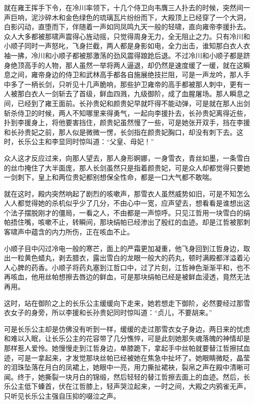 就在雍王挥手下令，在冷川率领下，十几个侍卫向韦膺三人扑去的时候，突然间一声巨响，泥沙碎木和金色绿色的琉璃瓦片纷纷而下，大殿顶上已经穿了一个大洞，白影闪动，直堕而下，伴随着一声如同凤鸣九天一般的轻啸，直向雍帝李援扑去。众人大多都被那啸声震得心旌动摇，只觉得周身无力，全无阻止之力。只有冷川和小顺子同时一声怒叱，飞身拦截，两人都是身影如电，全力出击，谁知那白衣人衣袖一拂，冷川和小顺子都被那激荡的劲风震得踉跄后退。不过冷川和小顺子都是跻身绝顶高手的人物，那人虽然一举将两人逼退，却仍然是速度缓了一缓，就在这瞬息之间，雍帝身边的侍卫和武林高手都各自施展绝技拦阻，可是一声龙吟，那人手中多了一柄长剑，只听见十几声脆响，那些护卫雍帝的高手都被那人刺中，更有一人被那白衣人一剑斩去了首级，鲜血四溅，九级御阶，成了血腥屠场。那人瞬息之间，已经到了雍王面前。长孙贵妃和颜贵妃早就吓得不能动弹，可是就在那人出剑斩杀侍卫的时候，两人不知哪里来得勇气，一起向李援扑去，长孙贵妃离得近些，扑到李援身上，将他要害挡住，颜贵妃虽然慢了一些，可是她张开双手，挡在李援和长孙贵妃之前，那人似是微微一愣，长剑指在颜贵妃胸口，却没有刺下去。这时，长乐公主和李显同时惊叫道：“父皇、母妃！”

众人这才反应过来，向那人望去，那人身形婀娜，一身雪衣，青丝如墨，一条雪白的丝巾掩住了大半面庞，那人长剑虽然只是指着颜贵妃，可是众人却都觉得只要她一剑刺下，皇上和两位贵妃都别想保全性命，都是一口大气都不敢喘。

就在这时，殿内突然响起了剧烈的咳嗽声，那雪衣人虽然威势如旧，可是不知怎么人人都觉得她的杀机似乎少了几分，不由心中一宽，应声望去，想看看是谁想出这个法子摆脱刚才的僵局，一看之人，不由都是一声惊呼。只见江哲用一块雪白的绢帕捂住嘴，咳嗽不止，转瞬间，那块绢帕已经渗出了殷红的血迹。却是江哲被那刺客啸声中蕴含的内力所伤，正在咳血不止。

小顺子目中闪过冷电一般的寒芒，面上的严霜更加凝重，他飞身回到江哲身边，取出一粒黄色蜡丸，剥去腊衣，露出雪白的龙眼一般大的药丸，顿时满殿都洋溢着沁人心脾的药香。小顺子将药丸塞到江哲口中，过了片刻，江哲神色渐渐平和，也不再咳血，他用丝帕想擦去唇边的鲜血，可是那块绢帕已经是被鲜血浸透，竟然无法再用。

这时，站在御阶之上的长乐公主缓缓向下走来，她若想走下御阶，必然要经过那雪衣女子的身旁，所以李援和长孙贵妃同时惊叫道：“贞儿，不要胡来。”

可是长乐公主却是仿佛没有听到一样，缓缓的走过那雪衣女子身边，两日来的忧虑和难以入眠，让长乐公主的花容带了几分憔悴，可是此刻她那失魂落魄的神情却是那样惹人爱怜。她慢慢走到江哲身边，单膝跪下，拿起手中丝帕就要替江哲擦拭血迹，可是一拿起来，才发觉那块丝帕已经被她在焦急中扯坏了。她眼睛微眨，晶莹的泪珠坠落在月白的凤裙上，她眼中一亮，用力撕扯裙袂，裂帛之声在殿中清晰可闻。终于，她撕裂一块月白的锦缎，然后轻轻的替江哲擦去面上的血迹。然后，长乐公主低下螓首，伏在江哲膝上，轻声哭泣起来，一时之间，大殿之内鸦雀无声，只听见长乐公主强自压抑的啜泣之声。

